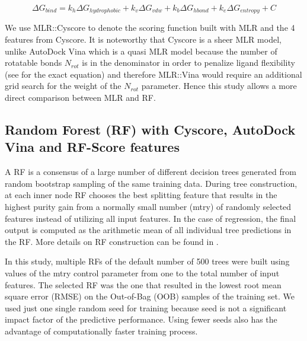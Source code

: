 \begin{equation}
\Delta G_{bind} = k_h\Delta G_{hydrophobic} + k_v\Delta G_{vdw} + k_b\Delta G_{hbond} + k_e\Delta G_{entropy} + C
\label{rfcyscore:cyscore}
\end{equation}

We use MLR::Cyscore to denote the scoring function built with MLR and the 4 features from Cyscore. It is noteworthy that Cyscore is a sheer MLR model, unlike AutoDock Vina \citep{595} which is a quasi MLR model because the number of rotatable bonds $N_{rot}$ is in the denominator in order to penalize ligand flexibility (see \citep{1362} for the exact equation) and therefore MLR::Vina would require an additional grid search for the weight of the $N_{rot}$ parameter. Hence this study allows a more direct comparison between MLR and RF.

\subsection{Random Forest (RF) with Cyscore, AutoDock Vina and RF-Score features}

A RF \citep{1309} is a consensus of a large number of different decision trees generated from random bootstrap sampling of the same training data. During tree construction, at each inner node RF chooses the best splitting feature that results in the highest purity gain from a normally small number (mtry) of randomly selected features instead of utilizing all input features. In the case of regression, the final output is computed as the arithmetic mean of all individual tree predictions in the RF. More details on RF construction can be found in \citep{564,1362}.

In this study, multiple RFs of the default number of 500 trees were built using values of the mtry control parameter from one to the total number of input features. The selected RF was the one that resulted in the lowest root mean square error (RMSE) on the Out-of-Bag (OOB) samples of the training set. We used just one single random seed for training because seed is not a significant impact factor of the predictive performance. Using fewer seeds also has the advantage of computationally faster training process.

